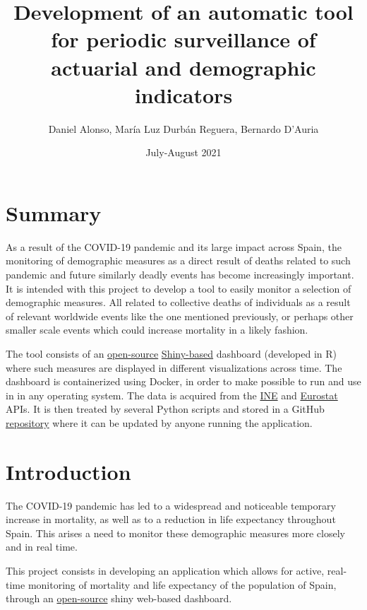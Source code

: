 \documentclass[
  a4paper]{article}
\title{Development of an automatic tool for periodic surveillance of
actuarial and demographic indicators}
\author{Daniel Alonso, María Luz Durbán Reguera, Bernardo D'Auria}
\date{July-August 2021}
\begin{document}
\maketitle

{
\hypersetup{linkcolor=}
\setcounter{tocdepth}{4}
\tableofcontents
}
\listoffigures
{}
\newpage

\hypertarget{summary}{%
\section{Summary}\label{summary}}

As a result of the COVID-19 pandemic and its large impact across Spain,
the monitoring of demographic measures as a direct result of deaths
related to such pandemic and future similarly deadly events has become
increasingly important. It is intended with this project to develop a
tool to easily monitor a selection of demographic measures. All related
to collective deaths of individuals as a result of relevant worldwide
events like the one mentioned previously, or perhaps other smaller scale
events which could increase mortality in a likely fashion.

The tool consists of an
\href{https://github.com/dreth/tfm_uc3m}{open-source}
\href{shiny.rstudio.com/}{Shiny-based} dashboard (developed in R) where
such measures are displayed in different visualizations across time. The
dashboard is containerized using Docker, in order to make possible to
run and use in in any operating system. The data is acquired from the
\href{https://ine.es/}{INE} and
\href{https://ec.europa.eu/eurostat/}{Eurostat} APIs. It is then treated
by several Python scripts and stored in a GitHub
\href{https://github.com/dreth/tfm_uc3m_data}{repository} where it can
be updated by anyone running the application.

\hypertarget{introduction}{%
\section{Introduction}\label{introduction}}

The COVID-19 pandemic has led to a widespread and noticeable temporary
increase in mortality, as well as to a reduction in life expectancy
throughout Spain. This arises a need to monitor these demographic
measures more closely and in real time.

This project consists in developing an application which allows for
active, real-time monitoring of mortality and life expectancy of the
population of Spain, through an
\href{https://github.com/dreth/tfm_uc3m}{open-source} shiny web-based
dashboard.
\end{document}
